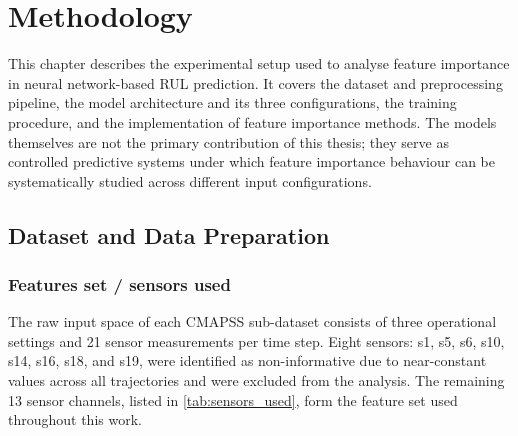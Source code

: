 \cleardoublepage

\chapter{Methodology}
\label{Chapter:Methodology}

This chapter describes the experimental setup used to analyse feature importance in neural network-based RUL prediction. It covers the dataset and preprocessing pipeline, the model architecture and its three configurations, the training procedure, and the implementation of feature importance methods. The models themselves are not the primary contribution of this thesis; they serve as controlled predictive systems under which feature importance behaviour can be systematically studied across different input configurations.



\section{Dataset and Data Preparation}

\subsection{Features set / sensors used}
The raw input space of each CMAPSS sub-dataset consists of three operational settings and 21 sensor measurements per time step. Eight sensors: s1, s5, s6, s10, s14, s16, s18, and s19, were identified as non-informative due to near-constant values across all trajectories and were excluded from the analysis. The remaining 13 sensor channels, listed in \ref{tab:sensors_used}, form the feature set used throughout this work.

